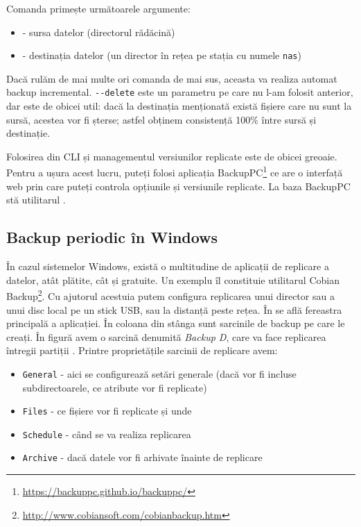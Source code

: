 Comanda  primește următoarele argumente:

\begin{itemize}
  \item \file{/} - sursa datelor (directorul rădăcină)
  \item {} - destinația datelor (un director în rețea pe stația cu numele \texttt{nas})
\end{itemize}

Dacă rulăm de mai multe ori comanda de mai sus, aceasta va realiza automat backup incremental.
\texttt{-{}-delete} este un parametru pe care nu l-am folosit anterior, dar este de obicei util: dacă la destinația menționată există fișiere care nu sunt la sursă, acestea vor fi șterse;
astfel obținem consistență 100\% între sursă și destinație.

Folosirea  din CLI și managementul versiunilor replicate este de obicei greoaie.
Pentru a ușura acest lucru, puteți folosi aplicația BackupPC\footnote{\url{https://backuppc.github.io/backuppc/}} ce are o interfață web prin care puteți controla opțiunile și versiunile replicate.
La baza BackupPC stă utilitarul .

\subsection{Backup periodic în Windows}
\label{sec:storage:backup:windows}

În cazul sistemelor Windows, există o multitudine de aplicații de replicare a datelor, atât plătite, cât și gratuite.
Un exemplu îl constituie utilitarul Cobian Backup\footnote{\url{http://www.cobiansoft.com/cobianbackup.htm}}.
Cu ajutorul acestuia putem configura replicarea unui director sau a unui disc local pe un stick USB, sau la distanță peste rețea.
În  se află fereastra principală a aplicației.
În coloana din stânga sunt sarcinile de backup pe care le creați.
În figură avem o sarcină denumită \textit{Backup D}, care va face replicarea întregii partiții .
Printre proprietățile sarcinii de replicare avem:

\begin{itemize}
  \item \texttt{General} - aici se configurează setări generale (dacă vor fi incluse subdirectoarele, ce atribute vor fi replicate)
  \item \texttt{Files} - ce fișiere vor fi replicate și unde
  \item \texttt{Schedule} - când se va realiza replicarea
  \item \texttt{Archive} - dacă datele vor fi arhivate înainte de replicare
\end{itemize}

